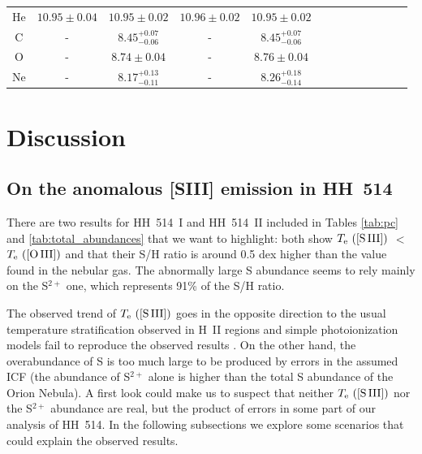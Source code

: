 \documentclass[fleqn,usenatbib]{mnras}
\begin{document}
\begin{table}
\begin{tabular}{ccccccccccccc}
He  &$10.95 \pm 0.04$  & $10.95 \pm 0.02$ & $10.96 \pm 0.02$ & $10.95 \pm 0.02$\\

C & - &$8.45 ^{+0.07} _{-0.06}$&-&$8.45 ^{+0.07} _{-0.06}$\\ 

O  &  - & $8.74 \pm 0.04$ &-&$8.76 \pm 0.04$\\ 

Ne  & - &$8.17 ^{+0.13} _{-0.11}$&-&$8.26 ^{+0.18} _{-0.14}$\\

\hline
\end{tabular}
\end{table}


\section{Discussion}
\label{sec:disc}


\subsection{On the anomalous [S\thinspace III] emission in HH~514}
\label{subsec:under_TS3}

There are two results for HH~514~I and HH~514~II included in Tables \ref{tab:pc} and \ref{tab:total_abundances}  that we want to highlight: both show $T_{\rm e} \text{ ([S\thinspace III])}$ $<$ $T_{\rm e} \text{ ([O\thinspace III])}$ and that their S/H ratio is around 0.5 dex higher than the value found in the nebular gas. The abnormally large S abundance seems to rely mainly on the S$^{2+}$ one, which represents 91\% of the S/H ratio.

The observed trend of $T_{\rm e} \text{ ([S\thinspace III])}$ goes in the opposite direction to the usual temperature stratification observed in H~II regions and simple photoionization models fail to reproduce the observed results \citep[][]{Binette2012}. On the other hand, the overabundance of S is too much large to be produced by errors in the assumed ICF (the abundance of S$^{2+}$ alone is higher than the total S abundance of the Orion Nebula). A first look could make us to suspect that neither $T_{\rm e} \text{ ([S\thinspace III])}$ nor the S$^{2+}$ abundance are real, but the product of errors in some part of our analysis of HH~514. In the following subsections we explore some scenarios that could explain the observed results.
\end{document}
